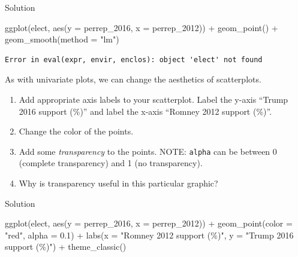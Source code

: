 \documentclass[
  letterpaper,
  DIV=11,
  numbers=noendperiod]{scrreprt}
\newenvironment{Shaded}{\begin{snugshade}}{\end{snugshade}}
\newcommand{\AttributeTok}[1]{\textcolor[rgb]{0.40,0.45,0.13}{#1}}
\newcommand{\FloatTok}[1]{\textcolor[rgb]{0.68,0.00,0.00}{#1}}
\newcommand{\FunctionTok}[1]{\textcolor[rgb]{0.28,0.35,0.67}{#1}}
\newcommand{\NormalTok}[1]{\textcolor[rgb]{0.00,0.23,0.31}{#1}}
\newcommand{\SpecialCharTok}[1]{\textcolor[rgb]{0.37,0.37,0.37}{#1}}
\newcommand{\StringTok}[1]{\textcolor[rgb]{0.13,0.47,0.30}{#1}}
\providecommand{\tightlist}{%
  \setlength{\itemsep}{0pt}\setlength{\parskip}{0pt}}\usepackage{longtable,booktabs,array}
\begin{document}
Solution

\begin{Shaded}
\begin{Highlighting}[]
\FunctionTok{ggplot}\NormalTok{(elect, }\FunctionTok{aes}\NormalTok{(}\AttributeTok{y =}\NormalTok{ perrep\_2016, }\AttributeTok{x =}\NormalTok{ perrep\_2012)) }\SpecialCharTok{+}
  \FunctionTok{geom\_point}\NormalTok{() }\SpecialCharTok{+}
  \FunctionTok{geom\_smooth}\NormalTok{(}\AttributeTok{method =} \StringTok{"lm"}\NormalTok{)}
\end{Highlighting}
\end{Shaded}

\begin{verbatim}
Error in eval(expr, envir, enclos): object 'elect' not found
\end{verbatim}

\begin{Shaded}
\begin{Highlighting}[]
\NormalTok{As with univariate plots, we can change the aesthetics of scatterplots.    }
\end{Highlighting}
\end{Shaded}

\begin{enumerate}
\def\labelenumi{\alph{enumi}.}
\tightlist
\item
  Add appropriate axis labels to your scatterplot. Label the y-axis
  ``Trump 2016 support (\%)'' and label the x-axis ``Romney 2012 support
  (\%)''.\\
\item
  Change the color of the points.\\
\item
  Add some \emph{transparency} to the points. NOTE: \texttt{alpha} can
  be between 0 (complete transparency) and 1 (no transparency).\\
\item
  Why is transparency useful in this particular graphic?
\end{enumerate}

Solution

\begin{Shaded}
\begin{Highlighting}[]
\FunctionTok{ggplot}\NormalTok{(elect, }\FunctionTok{aes}\NormalTok{(}\AttributeTok{y =}\NormalTok{ perrep\_2016, }\AttributeTok{x =}\NormalTok{ perrep\_2012)) }\SpecialCharTok{+}
  \FunctionTok{geom\_point}\NormalTok{(}\AttributeTok{color =} \StringTok{"red"}\NormalTok{, }\AttributeTok{alpha =} \FloatTok{0.1}\NormalTok{) }\SpecialCharTok{+}
  \FunctionTok{labs}\NormalTok{(}\AttributeTok{x =} \StringTok{"Romney 2012 support (\%)"}\NormalTok{, }\AttributeTok{y =} \StringTok{"Trump 2016 support (\%)"}\NormalTok{) }\SpecialCharTok{+} 
  \FunctionTok{theme\_classic}\NormalTok{()}
\end{Highlighting}
\end{Shaded}
\end{document}
